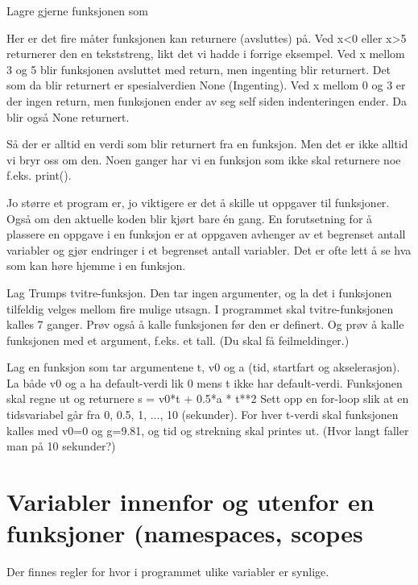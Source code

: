 {Lagre gjerne funksjonen som 

Her er det fire måter funksjonen kan returnere (avsluttes) på. Ved x<0 eller x>5 returnerer den en tekststreng, likt det vi hadde i forrige eksempel. Ved x mellom 3 og 5 blir funksjonen avsluttet med return, men ingenting blir returnert. Det som da blir returnert er spesialverdien None (Ingenting). Ved x mellom 0 og 3 er der ingen return, men funksjonen ender av seg self siden 
indenteringen ender. Da blir også None returnert.

Så der er alltid en verdi som blir returnert fra en funksjon. Men det er ikke alltid vi bryr oss om den. Noen ganger har vi en funksjon som ikke skal returnere noe f.eks. print().

Jo større et program er, jo viktigere er det å skille ut oppgaver til funksjoner. Også om den aktuelle koden blir kjørt bare én gang. En forutsetning for å plassere en oppgave i en funksjon er at oppgaven avhenger av et begrenset antall variabler og gjør endringer i et begrenset antall variabler. Det er ofte lett å se hva som kan høre hjemme i en funksjon. 

\begin{question}
Lag Trumps tvitre-funksjon. Den tar ingen argumenter, og la det i funksjonen tilfeldig velges mellom fire mulige utsagn. I programmet skal tvitre-funksjonen kalles 7 ganger. Prøv også å kalle funksjonen før den er definert. Og prøv å kalle funksjonen med et argument, f.eks. et tall. (Du skal få feilmeldinger.) 
\end{question}

\begin{question}
Lag en funksjon som tar argumentene t, v0 og a (tid, startfart og akselerasjon). La både v0 og a ha default-verdi lik 0 mens t ikke har default-verdi. Funksjonen skal regne ut og returnere  s = v0*t + 0.5*a * t**2 Sett opp en for-loop slik at en tidsvariabel går fra 0, 0.5, 1, ..., 10 (sekunder). For hver t-verdi skal funksjonen kalles med v0=0 og g=9.81, og tid og strekning skal printes ut. (Hvor langt faller man på 10 sekunder?)
\end{question}

\section{Variabler innenfor og utenfor en funksjoner (namespaces, scopes}

Der finnes regler for hvor i programmet ulike variabler er synlige. 

}
